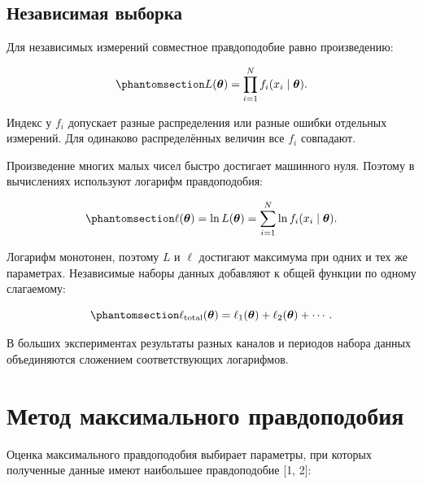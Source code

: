 \documentclass[
  russian,
  11pt,
  a4paper,
  open=any]{scrbook}
\begin{document}
\subsection{Независимая
выборка}\label{ux43dux435ux437ux430ux432ux438ux441ux438ux43cux430ux44f-ux432ux44bux431ux43eux440ux43aux430}

Для независимых измерений совместное правдоподобие равно произведению:

\begin{equation}\protect\phantomsection\label{eq-ch9-independent-likelihood}{
L(\boldsymbol\theta)
=\prod_{i=1}^{N}f_i(x_i\mid\boldsymbol\theta).
}\end{equation}

Индекс у \(f_i\) допускает разные распределения или разные ошибки
отдельных измерений. Для одинаково распределённых величин все \(f_i\)
совпадают.

Произведение многих малых чисел быстро достигает машинного нуля. Поэтому
в вычислениях используют логарифм правдоподобия:

\begin{equation}\protect\phantomsection\label{eq-ch9-log-likelihood}{
\ell(\boldsymbol\theta)
=\ln L(\boldsymbol\theta)
=\sum_{i=1}^{N}\ln f_i(x_i\mid\boldsymbol\theta).
}\end{equation}

Логарифм монотонен, поэтому \(L\) и \(\ell\) достигают максимума при
одних и тех же параметрах. Независимые наборы данных добавляют к общей
функции по одному слагаемому:

\begin{equation}\protect\phantomsection\label{eq-ch9-combined-log-likelihood}{
\ell_{\mathrm{total}}(\boldsymbol\theta)
=\ell_1(\boldsymbol\theta)+\ell_2(\boldsymbol\theta)+\cdots.
}\end{equation}

В больших экспериментах результаты разных каналов и периодов набора
данных объединяются сложением соответствующих логарифмов.

\section{Метод максимального
правдоподобия}\label{ux43cux435ux442ux43eux434-ux43cux430ux43aux441ux438ux43cux430ux43bux44cux43dux43eux433ux43e-ux43fux440ux430ux432ux434ux43eux43fux43eux434ux43eux431ux438ux44f}

Оценка максимального правдоподобия выбирает параметры, при которых
полученные данные имеют наибольшее правдоподобие {[}1, 2{]}:
\end{document}
